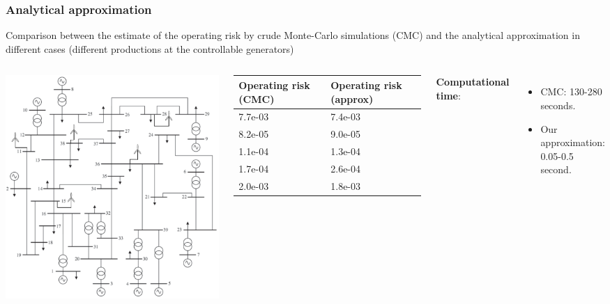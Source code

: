 \documentclass{beamer}
\begin{document}
\begin{frame}
  \frametitle{Analytical approximation}
  \begin{block}{}
Comparison between the estimate of the operating risk by crude Monte-Carlo simulations (CMC) and the analytical approximation in different cases (different productions at the controllable generators)
  \end{block}
\begin{columns}
  \includegraphics[width=\textwidth]{Figs/ieee39buswind}
\begin{tabular}{p{2.5cm}p{2.5cm}}
\toprule
Operating risk (CMC) & Operating risk (approx)\\
\midrule
7.7e-03 & 7.4e-03\tabularnewline
8.2e-05 & 9.0e-05\tabularnewline
1.1e-04 & 1.3e-04\tabularnewline
1.7e-04 & 2.6e-04\tabularnewline
2.0e-03 & 1.8e-03\tabularnewline
\bottomrule
\end{tabular}
\textbf{Computational time}:
\begin{itemize}
\item CMC: 130-280 seconds.
\item Our approximation: 0.05-0.5 second.
\end{itemize}
\end{columns}  
\end{frame}
\end{document}

